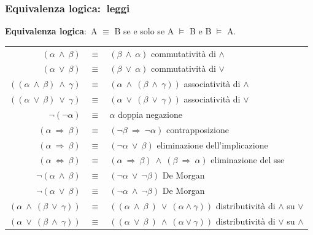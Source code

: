 \subsubsection{Equivalenza logica:\ leggi}

\textbf{Equivalenza logica}:\ A $\equiv$ B se e solo se A $\models$ B e B $\models$ A.

\begin{table}[H]
	\centering
	\begin{tabular}{r c l}
		$(\alpha\ \land\ \beta)$                  & $\equiv$ & $(\beta\ \land\ \alpha)$ \quad commutatività di $\land$                                             \\
		$(\alpha\ \lor\ \beta)$                   & $\equiv$ & $(\beta\ \lor\ \alpha)$ \quad commutatività di $\lor$                                               \\
		$((\alpha\ \land\ \beta)\ \land\ \gamma)$ & $\equiv$ & $(\alpha\ \land\ (\beta\ \land\ \gamma))$ \quad associatività di $\land$                            \\
		$((\alpha\ \lor\ \beta)\ \lor\ \gamma)$   & $\equiv$ & $(\alpha\ \lor\ (\beta\ \lor\ \gamma))$ \quad associatività di $\lor$                               \\
		$\lnot(\lnot\alpha)$                      & $\equiv$ & $\alpha$ \quad doppia negazione                                                                     \\
		$(\alpha\ \Rightarrow\ \beta)$            & $\equiv$ & $(\lnot \beta\ \Rightarrow\ \lnot \alpha)$ \quad contrapposizione                                   \\
		$(\alpha\ \Rightarrow\ \beta)$            & $\equiv$ & $(\lnot \alpha\ \lor\ \beta)$ \quad eliminazione dell'implicazione                                  \\
		$(\alpha\ \Leftrightarrow\ \beta)$        & $\equiv$ & $(\alpha\ \Rightarrow\ \beta)\ \land\ (\beta\ \Rightarrow\ \alpha)$ \quad eliminazione del sse      \\
		$\lnot(\alpha\ \land\ \beta)$             & $\equiv$ & $(\lnot \alpha\ \lor\ \lnot \beta)$ \quad De Morgan                                                 \\
		$\lnot(\alpha\ \lor\ \beta)$              & $\equiv$ & $(\lnot \alpha\ \land\ \lnot \beta)$ \quad De Morgan                                                \\
		$(\alpha\ \land\ (\beta\ \lor\ \gamma))$  & $\equiv$ & $((\alpha\ \land\ \beta\ )\ \lor\ (\alpha \land \gamma))$ \quad distributività di $\land$ su $\lor$ \\
		$(\alpha\ \lor\ (\beta\ \land\ \gamma))$  & $\equiv$ & $((\alpha\ \lor\ \beta\ )\ \land\ (\alpha \lor \gamma))$ \quad distributività di $\lor$ su $\land$  \\
	\end{tabular}
\end{table}

